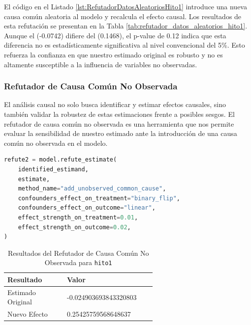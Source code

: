 El código en el Listado \ref{lst:RefutadorDatosAleatoriosHito1} introduce una nueva causa común aleatoria al modelo y recalcula el efecto causal. Los resultados de esta refutación se presentan en la Tabla \ref{tab:refutador_datos_aleatorios_hito1}. Aunque el  (-0.0742) difiere del  (0.1468), el p-value de 0.12 indica que esta diferencia no es estadísticamente significativa al nivel convencional del 5\%. Esto refuerza la confianza en que nuestro estimado original es robusto y no es altamente susceptible a la influencia de variables no observadas.



\subsubsection{Refutador de Causa Común No Observada}

El análisis causal no solo busca identificar y estimar efectos causales, sino también validar la robustez de estas estimaciones frente a posibles sesgos. El refutador de causa común no observada es una herramienta que nos permite evaluar la sensibilidad de nuestro estimado ante la introducción de una causa común no observada en el modelo.

\begin{minipage}{0.5\textwidth}
    \begin{lstlisting}[language=Python, caption=Refutador de causa común no observada para \texttt{hito1}, label=lst:RefutadorCausaComúnNoObservadaHito1]
refute2 = model.refute_estimate(
    identified_estimand,
    estimate,
    method_name="add_unobserved_common_cause",
    confounders_effect_on_treatment="binary_flip",
    confounders_effect_on_outcome="linear",
    effect_strength_on_treatment=0.01,
    effect_strength_on_outcome=0.02,
)
\end{lstlisting}
\end{minipage}
\hfill
\begin{minipage}{0.45\textwidth}
    \begin{table}[H]
        \centering
        \begin{tabular}{lp{0.6\linewidth}}
            \toprule
            \textbf{Resultado} & \textbf{Valor} \\
            \midrule
            Estimado Original & -0.024903693843320803 \\
            Nuevo Efecto & 0.25425759568648637 \\
            \bottomrule
        \end{tabular}
        \caption{Resultados del Refutador de Causa Común No Observada para \texttt{hito1}}
        \label{tab:refutador_causa_no_observada_hito1}
    \end{table}
\end{minipage}

